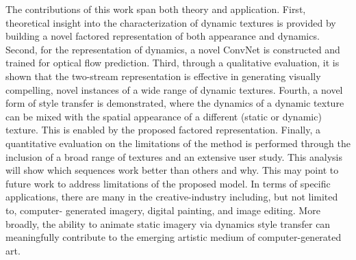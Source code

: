 The contributions of this work span both theory and application. First,
theoretical insight into the characterization of dynamic textures is provided by 
building a novel factored representation of both appearance and dynamics. Second, 
for the representation of dynamics, a novel ConvNet is constructed and trained for 
optical flow prediction. Third, through a qualitative evaluation, it is shown that the two-stream representation is 
effective in generating visually compelling, novel instances of a wide range of 
dynamic textures. Fourth, a novel form of style transfer is demonstrated, 
where the dynamics of a dynamic texture can be mixed with the spatial appearance 
of a different (static or dynamic) texture. This is enabled by the proposed factored 
representation. Finally, a quantitative evaluation on the limitations of the method is performed through 
the inclusion of a broad range of textures and an extensive user study. This analysis will show which 
sequences work better than others and why. This may point to future work to 
address limitations of the proposed model. In terms of specific applications, 
there are many in the creative-industry including, but not limited to, computer-
generated imagery, digital painting, and image editing. More broadly, the ability 
to animate static imagery via dynamics style transfer can meaningfully contribute 
to the emerging artistic medium of computer-generated art.
